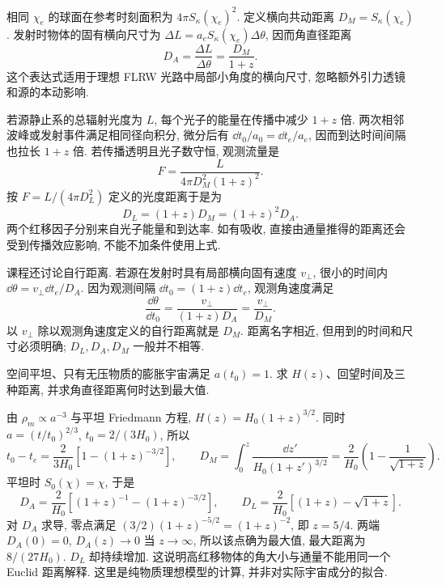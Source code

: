 相同 $\chi_e$ 的球面在参考时刻面积为 $4\pi S_\kappa(\chi_e)^2$. 定义横向共动距离 $D_M=S_\kappa(\chi_e)$. 发射时物体的固有横向尺寸为 $\Delta L=a_eS_\kappa(\chi_e)\Delta\theta$, 因而角直径距离
\begin{equation}\label{gr6-distance-relations}
 D_A=\frac{\Delta L}{\Delta\theta}=\frac{D_M}{1+z}.
\end{equation}
这个表达式适用于理想 FLRW 光路中局部小角度的横向尺寸, 忽略额外引力透镜和源的本动影响.

若源静止系的总辐射光度为 $L$, 每个光子的能量在传播中减少 $1+z$ 倍. 两次相邻波峰或发射事件满足相同径向积分, 微分后有 $\dd t_0/a_0=\dd t_e/a_e$, 因而到达时间间隔也拉长 $1+z$ 倍. 若传播透明且光子数守恒, 观测流量是
\[
 F=\frac{L}{4\pi D_M^2(1+z)^2}.
\]
按 $F=L/(4\pi D_L^2)$ 定义的光度距离于是为
\begin{equation}\label{gr6-luminosity-distance}
 D_L=(1+z)D_M=(1+z)^2D_A.
\end{equation}
两个红移因子分别来自光子能量和到达率. 如有吸收, 直接由通量推得的距离还会受到传播效应影响, 不能不加条件使用上式.

课程还讨论自行距离. 若源在发射时具有局部横向固有速度 $v_\perp$, 很小的时间内 $\dd\theta=v_\perp\dd t_e/D_A$. 因为观测间隔 $\dd t_0=(1+z)\dd t_e$, 观测角速度满足
\[
 \frac{\dd\theta}{\dd t_0}=\frac{v_\perp}{(1+z)D_A}=\frac{v_\perp}{D_M}.
\]
以 $v_\perp$ 除以观测角速度定义的自行距离就是 $D_M$. 距离名字相近, 但用到的时间和尺寸必须明确; $D_L,D_A,D_M$ 一般并不相等.

\begin{example}
空间平坦、只有无压物质的膨胀宇宙满足 $a(t_0)=1$. 求 $H(z)$、回望时间及三种距离, 并求角直径距离何时达到最大值.
\end{example}
\begin{solution}
由 $\rho_m\propto a^{-3}$ 与平坦 Friedmann 方程, $H(z)=H_0(1+z)^{3/2}$. 同时 $a=(t/t_0)^{2/3}$, $t_0=2/(3H_0)$, 所以
\[
 t_0-t_e=\frac{2}{3H_0}[1-(1+z)^{-3/2}],
 \qquad
 D_M=\int_0^z\frac{\dd z'}{H_0(1+z')^{3/2}}
     =\frac2{H_0}\left(1-\frac1{\sqrt{1+z}}\right).
\]
平坦时 $S_0(\chi)=\chi$, 于是
\[
 D_A=\frac2{H_0}\left[(1+z)^{-1}-(1+z)^{-3/2}\right],\qquad
 D_L=\frac2{H_0}\left[(1+z)-\sqrt{1+z}\right].
\]
对 $D_A$ 求导, 零点满足 $(3/2)(1+z)^{-5/2}=(1+z)^{-2}$, 即 $z=5/4$. 两端 $D_A(0)=0$, $D_A(z)\to0$ 当 $z\to\infty$, 所以该点确为最大值, 最大距离为 $8/(27H_0)$. $D_L$ 却持续增加. 这说明高红移物体的角大小与通量不能用同一个 Euclid 距离解释. 这里是纯物质理想模型的计算, 并非对实际宇宙成分的拟合.
\end{solution}

